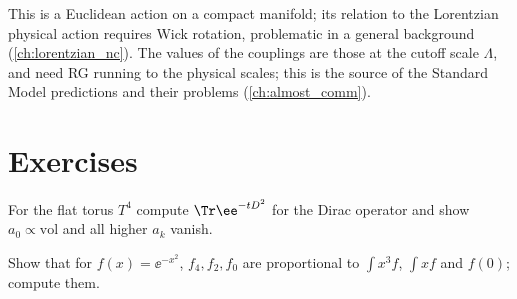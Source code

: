 \begin{whatwrong}
This is a Euclidean action on a compact manifold; its relation to the Lorentzian physical action requires Wick rotation, problematic in a general background (\cref{ch:lorentzian_nc}). The values of the couplings are those at the cutoff scale $\Lambda$, and need RG running to the physical scales; this is the source of the Standard Model predictions and their problems (\cref{ch:almost_comm}).
\end{whatwrong}

\section*{Exercises}
\begin{exercise}
For the flat torus $T^4$ compute $\Tr\ee^{-tD^2}$ for the Dirac operator and show $a_0\propto\mathrm{vol}$ and all higher $a_k$ vanish.
\end{exercise}
\begin{exercise}
Show that for $f(x)=\ee^{-x^2}$, $f_4,f_2,f_0$ are proportional to $\int x^3f$, $\int xf$ and $f(0)$; compute them.
\end{exercise}
